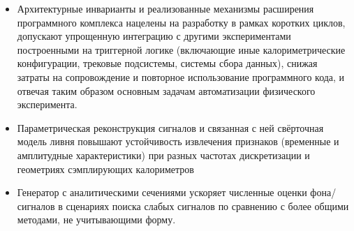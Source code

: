 \begin{itemize}
    \item Архитектурные инварианты и реализованные механизмы
    расширения программного комплекса нацелены на разработку
    в рамках коротких циклов, допускают упрощенную интеграцию с
    другими экспериментами построенными на триггерной логике (включающие
    иные калориметрические конфигурации, трековые подсистемы,
    системы сбора данных), снижая затраты на сопровождение
    и повторное использование программного кода, и отвечая таким образом
    основным задачам автоматизации физического эксперимента.
    \item Параметрическая реконструкция сигналов и связанная с ней
    свёрточная модель ливня повышают устойчивость извлечения
    признаков (временные и амплитудные характеристики)
    при разных частотах дискретизации и геометриях
    сэмплирующих калориметров
    \item Генератор с аналитическими сечениями ускоряет
    численные оценки фона/сигналов в сценариях поиска слабых
    сигналов по сравнению с более общими методами, не
    учитывающими форму.
\end{itemize}



\begin{comment}
\paragraph{Благодарности}

Автор выражает благодарность научному руководителю
диссертационной работы профессору Валерию Ефимовичу Любовицкому
за знакомство с научным процессом современной физики высоких
энергий и обширную теоретическую перспективу. Автор глубоко
признателен руководителю эксперимента NA64 Сергею Николаевичу
Гниненко за предоставленные возможности и проницательные
комментарии о постановке эксперимента.
Михаила Михайловича Кирсанова за поддержку и наставления.
Автор благодарит Алексея Эдуардовича Шевелёва за неоценимую помощь
в реализации модулей реконструкции треков и тестировании всего
программного окружения. Сергея Герасимова за тестирование и ценные
комментарии об обобщённой реализации алгоритма CATS применительно
к модельным данным Belle II, Миральда Тузи (Mirald Tuzi) и
Генри Зибера (Dr. Henri Hugo Sieber) за тестирование реализации алгоритма
CATS в NA64. Решающий вклад в практическое тестирование, интеграцию и отладку
параметров реконструкции сигналов сэмплирующих преобразователей применительно
к физическим задачам внесли Андреа Челентано
(Dr. Andrea Celentano) и Лука Марсикано (Dr. Luca Marsicano).
\end{comment}